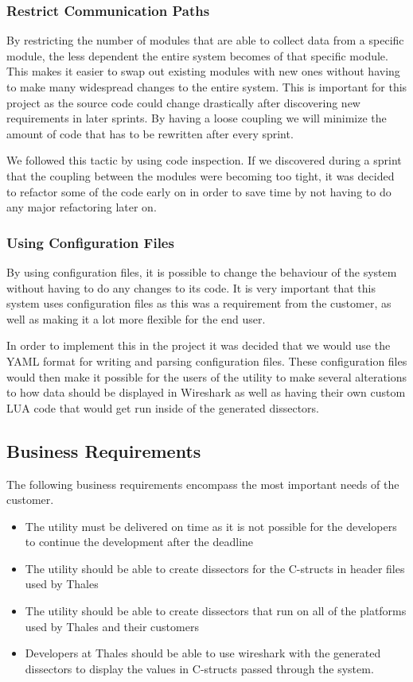 \subsubsection{Restrict Communication Paths}
By restricting the number of modules that are able to collect data from a specific module, the less dependent the entire system becomes of that specific module. This makes it easier to swap out existing modules with new ones without having to make many widespread changes to the entire system. This is important for this project as the source code could change drastically after discovering new requirements in later sprints. By having a loose coupling we will minimize the amount of code that has to be rewritten after every sprint.

We followed this tactic by using code inspection. If we discovered during a sprint that the coupling between the modules were becoming too tight, it was decided to refactor some of the code early on in order to save time by not having to do any major refactoring later on.

\subsubsection{Using Configuration Files}
By using configuration files, it is possible to change the behaviour of the system without having to do any changes to its code. It is very important that this system uses configuration files as this was a requirement from the customer, as well as making it a lot more flexible for the end user.

In order to implement this in the project it was decided that we would use the YAML format for writing and parsing configuration files. These configuration files would then make it possible for the users of the utility to make several alterations to how data should be displayed in Wireshark as well as having their own custom LUA code that would get run inside of the generated dissectors.

\subsection{Business Requirements}
The following business requirements encompass the most important needs of the customer.
\begin{itemize}
\item The \gls{utility} must be delivered on time as it is not possible for the
developers to continue the development after the deadline
\item The utility should be able to create dissectors for the C-structs in
header files used by Thales
\item The utility should be able to create dissectors that run on all of the
platforms used by Thales and their customers
\item Developers at Thales should be able to use \Gls{wireshark} with the generated
dissectors to display the values in C-structs passed through the
system.
\end{itemize}

